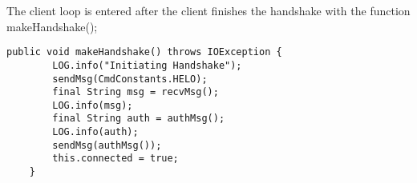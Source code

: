 \documentclass[a4paper]{article} %
\begin{document}
The client loop is entered after the client finishes the handshake with the
function makeHandshake();

\begin{lstlisting}
public void makeHandshake() throws IOException {
        LOG.info("Initiating Handshake");
        sendMsg(CmdConstants.HELO);
        final String msg = recvMsg();
        LOG.info(msg);
        final String auth = authMsg();
        LOG.info(auth);
        sendMsg(authMsg());
        this.connected = true;
    }
\end{lstlisting}



\end{document}
